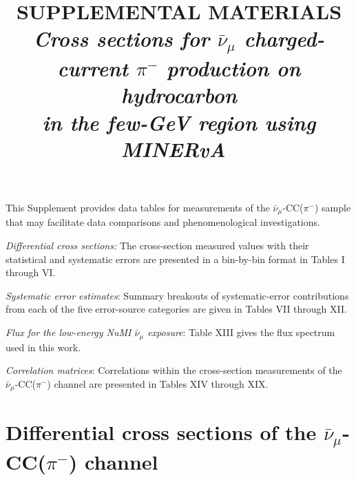 \documentclass[aps, prd, reprint,showpacs,  preprintnumbers,amsmath,amssymb,superscriptaddress, nofootinbib]{revtex4-1}
\newcommand{\anumu}{\ensuremath{\bar{\nu}_{\mu}}}
\newcommand{\minerva}{MINERvA~}
\begin{document}


\title{SUPPLEMENTAL MATERIALS\\ {\it Cross sections for $\anumu$ charged-current $\pi^{-}$ production on hydrocarbon\\ 
in the few-GeV region using \minerva}}    

\smallskip
\vspace{10pt}   

\begin{abstract}
\end{abstract}


\maketitle

This Supplement provides data tables for measurements of the $\anumu$-CC($\pi^{-}$) sample
that may facilitate data comparisons and phenomenological investigations.

\smallskip
\noindent
{\it Differential cross sections:}  The cross-section measured values with their statistical and systematic errors are 
presented in a bin-by-bin format in Tables I through VI. 

\smallskip
\noindent
{\it Systematic error estimates}:  Summary breakouts of systematic-error contributions from each 
of the five error-source categories are given in Tables VII through XII.

\smallskip
\noindent
{\it Flux for the low-energy NuMI $\anumu$ exposure}:  Table XIII gives the flux spectrum used in this work.

\smallskip
\noindent
{\it Correlation matrices}: Correlations within the cross-section measurements of the $\anumu$-CC($\pi^{-}$) channel
are presented in Tables XIV through XIX.

\section{Differential cross sections of the $\anumu$-CC($\pi^{-}$) channel}
\end{document}

